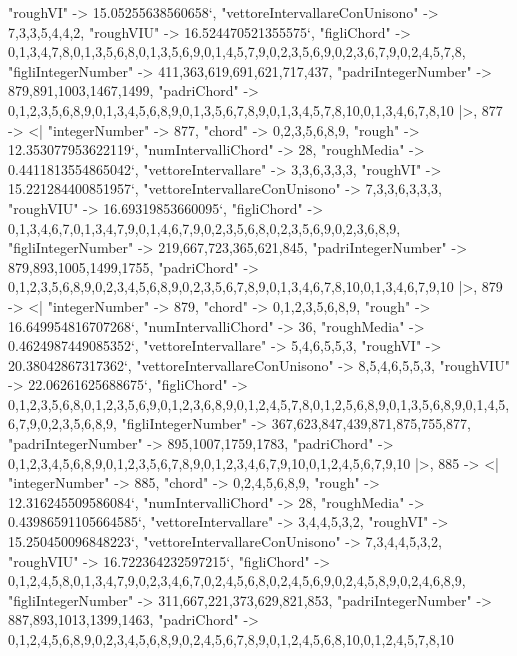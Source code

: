 \documentclass[
]{article}
\begin{document}
\begin{DatasetVerbatim}
    "roughVI" -> 15.05255638560658`,
    "vettoreIntervallareConUnisono" -> {7,3,3,5,4,4,2},
    "roughVIU" -> 16.524470521355575`,
    "figliChord" -> {{0,1,3,4,7,8},{0,1,3,5,6,8},{0,1,3,5,6,9},{0,1,4,5,7,9},{0,2,3,5,6,9},{0,2,3,6,7,9},{0,2,4,5,7,8}},
    "figliIntegerNumber" -> {411,363,619,691,621,717,437},
    "padriIntegerNumber" -> {879,891,1003,1467,1499},
    "padriChord" -> {{0,1,2,3,5,6,8,9},{0,1,3,4,5,6,8,9},{0,1,3,5,6,7,8,9},{0,1,3,4,5,7,8,10},{0,1,3,4,6,7,8,10}}
  |>,
  877 -> <|
    "integerNumber" -> 877,
    "chord" -> {0,2,3,5,6,8,9},
    "rough" -> 12.353077953622119`,
    "numIntervalliChord" -> 28,
    "roughMedia" -> 0.4411813554865042`,
    "vettoreIntervallare" -> {3,3,6,3,3,3},
    "roughVI" -> 15.221284400851957`,
    "vettoreIntervallareConUnisono" -> {7,3,3,6,3,3,3},
    "roughVIU" -> 16.69319853660095`,
    "figliChord" -> {{0,1,3,4,6,7},{0,1,3,4,7,9},{0,1,4,6,7,9},{0,2,3,5,6,8},{0,2,3,5,6,9},{0,2,3,6,8,9}},
    "figliIntegerNumber" -> {219,667,723,365,621,845},
    "padriIntegerNumber" -> {879,893,1005,1499,1755},
    "padriChord" -> {{0,1,2,3,5,6,8,9},{0,2,3,4,5,6,8,9},{0,2,3,5,6,7,8,9},{0,1,3,4,6,7,8,10},{0,1,3,4,6,7,9,10}}
  |>,
  879 -> <|
    "integerNumber" -> 879,
    "chord" -> {0,1,2,3,5,6,8,9},
    "rough" -> 16.649954816707268`,
    "numIntervalliChord" -> 36,
    "roughMedia" -> 0.4624987449085352`,
    "vettoreIntervallare" -> {5,4,6,5,5,3},
    "roughVI" -> 20.38042867317362`,
    "vettoreIntervallareConUnisono" -> {8,5,4,6,5,5,3},
    "roughVIU" -> 22.06261625688675`,
    "figliChord" -> {{0,1,2,3,5,6,8},{0,1,2,3,5,6,9},{0,1,2,3,6,8,9},{0,1,2,4,5,7,8},{0,1,2,5,6,8,9},{0,1,3,5,6,8,9},{0,1,4,5,6,7,9},{0,2,3,5,6,8,9}},
    "figliIntegerNumber" -> {367,623,847,439,871,875,755,877},
    "padriIntegerNumber" -> {895,1007,1759,1783},
    "padriChord" -> {{0,1,2,3,4,5,6,8,9},{0,1,2,3,5,6,7,8,9},{0,1,2,3,4,6,7,9,10},{0,1,2,4,5,6,7,9,10}}
  |>,
  885 -> <|
    "integerNumber" -> 885,
    "chord" -> {0,2,4,5,6,8,9},
    "rough" -> 12.316245509586084`,
    "numIntervalliChord" -> 28,
    "roughMedia" -> 0.43986591105664585`,
    "vettoreIntervallare" -> {3,4,4,5,3,2},
    "roughVI" -> 15.250450096848223`,
    "vettoreIntervallareConUnisono" -> {7,3,4,4,5,3,2},
    "roughVIU" -> 16.722364232597215`,
    "figliChord" -> {{0,1,2,4,5,8},{0,1,3,4,7,9},{0,2,3,4,6,7},{0,2,4,5,6,8},{0,2,4,5,6,9},{0,2,4,5,8,9},{0,2,4,6,8,9}},
    "figliIntegerNumber" -> {311,667,221,373,629,821,853},
    "padriIntegerNumber" -> {887,893,1013,1399,1463},
    "padriChord" -> {{0,1,2,4,5,6,8,9},{0,2,3,4,5,6,8,9},{0,2,4,5,6,7,8,9},{0,1,2,4,5,6,8,10},{0,1,2,4,5,7,8,10}}

\end{DatasetVerbatim}
\end{document}
